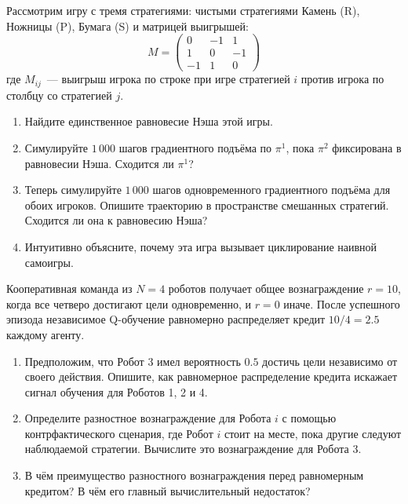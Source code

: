 \begin{exercise}
\label{ex:self-play-rps}
Рассмотрим игру с тремя стратегиями: чистыми стратегиями Камень (R), Ножницы
(P), Бумага (S) и матрицей выигрышей:
\[
M = \begin{pmatrix} 0 & -1 & 1 \\ 1 & 0 & -1 \\ -1 & 1 & 0
\end{pmatrix}
\]
где $M_{ij}$~--- выигрыш игрока по строке при игре стратегией $i$
против игрока по столбцу со стратегией $j$.
\begin{enumerate}[label=(\alph*)]
  \item Найдите единственное равновесие Нэша этой игры.
  \item Симулируйте $1\,000$ шагов градиентного подъёма по $\pi^1$, пока
    $\pi^2$ фиксирована в равновесии Нэша. Сходится ли $\pi^1$?
  \item Теперь симулируйте $1\,000$ шагов одновременного градиентного подъёма
    для обоих игроков. Опишите траекторию в пространстве смешанных
    стратегий. Сходится ли она к равновесию Нэша?
  \item Интуитивно объясните, почему эта игра вызывает циклирование наивной самоигры.
\end{enumerate}
\end{exercise}

\begin{exercise}
\label{ex:credit-assignment}
Кооперативная команда из $N = 4$ роботов получает общее вознаграждение $r =
10$, когда все четверо достигают цели одновременно, и $r = 0$ иначе.
После успешного эпизода независимое Q-обучение равномерно распределяет
кредит $10/4 = 2.5$ каждому агенту.
\begin{enumerate}[label=(\alph*)]
  \item Предположим, что Робот 3 имел вероятность $0.5$ достичь цели
    независимо от своего действия. Опишите, как равномерное распределение кредита
    искажает сигнал обучения для Роботов 1, 2 и 4.
  \item Определите разностное вознаграждение для Робота $i$ с помощью контрфактического
    сценария, где Робот $i$ стоит на месте, пока другие следуют наблюдаемой стратегии.
    Вычислите это вознаграждение для Робота 3.
  \item В чём преимущество разностного вознаграждения перед равномерным
    кредитом? В чём его главный вычислительный недостаток?
\end{enumerate}
\end{exercise}

